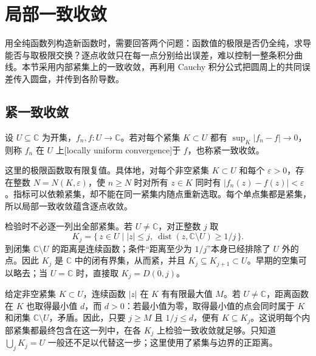 \section{局部一致收敛}
\label{b3:sec:0401}

用全纯函数列构造新函数时，需要回答两个问题：函数值的极限是否仍全纯，求导能否与取极限交换？逐点收敛只在每一点分别给出误差，难以控制一整条积分曲线。本节采用内部紧集上的一致收敛，再利用 Cauchy 积分公式把圆周上的共同误差传入圆盘，并传到各阶导数。

\subsection{紧一致收敛}
\label{b3:subsec:040101}

\begin{definition}\label{b3:def:04-compact-convergence}
设 \(U\subseteq\mathbb C\) 为开集，\(f_n,f:U\rightarrow\mathbb C\)。若对每个紧集 \(K\subset U\) 都有 \(\sup_K|f_n-f|\rightarrow0\)，则称 \(f_n\) 在 \(U\) 上[locally uniform convergence]于 \(f\)，也称紧一致收敛。
\end{definition}

这里的极限函数取有限复值。具体地，对每个非空紧集 \(K\subset U\) 和每个 \(\varepsilon>0\)，存在整数 \(N=N(K,\varepsilon)\)，使 \(n\ge N\) 时对所有 \(z\in K\) 同时有 \(|f_n(z)-f(z)|<\varepsilon\)。指标可以依赖紧集，却不能在同一紧集内随点重新选取。每个单点集都是紧集，所以局部一致收敛蕴含逐点收敛。

\ProseParagraphBreak

检验时不必逐一列出全部紧集。若 \(U\ne\mathbb C\)，对正整数 \(j\) 取
\[
 K_j=\{\,z\in U\mid |z|\le j,\ \operatorname{dist}(z,\mathbb C\setminus U)\ge1/j\,\}.
\]
到闭集 \(\mathbb C\setminus U\) 的距离是连续函数；条件“距离至少为 \(1/j\)”本身已经排除了 \(U\) 外的点。因此 \(K_j\) 是 \(\mathbb C\) 中的闭有界集，从而紧，并且 \(K_j\subseteq K_{j+1}\subset U\)。早期的空集可以略去；当 \(U=\mathbb C\) 时，直接取 \(K_j=\overline{D(0,j)}\)。

\ProseParagraphBreak

给定非空紧集 \(K\subset U\)，连续函数 \(|z|\) 在 \(K\) 有有限最大值 \(M\)。若 \(U\ne\mathbb C\)，距离函数在 \(K\) 也取得最小值 \(d\)，而 \(d>0\)：若最小值为零，取得最小值的点会同时属于 \(K\) 和闭集 \(\mathbb C\setminus U\)，矛盾。因此，只要 \(j\ge M\) 且 \(1/j\le d\)，便有 \(K\subseteq K_j\)。这说明每个内部紧集都最终包含在这一列中，在各 \(K_j\) 上检验一致收敛就足够。只知道 \(\bigcup_jK_j=U\) 一般还不足以代替这一步；这里使用了紧集与边界的正距离。

